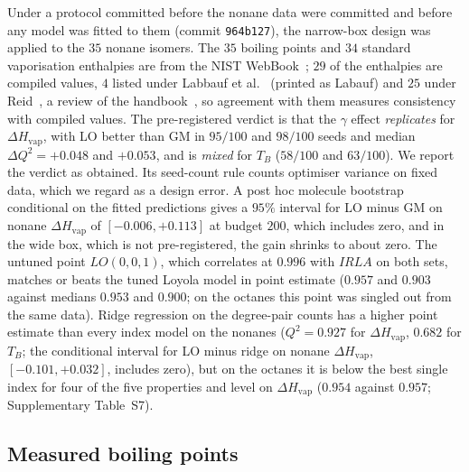 Under a protocol committed before the nonane data were committed and
before any model was fitted to them (commit \texttt{964b127}), the
narrow-box design was applied to the $35$ nonane isomers. The $35$ boiling
points and $34$ standard vaporisation enthalpies are from the NIST
WebBook~\cite{NISTWebBook}; $29$ of the enthalpies are compiled values,
$4$ listed under Labbauf et al.~\cite{LabaufGreenshieldsRossini1961} (printed as Labauf) and
$25$ under Reid~\cite{Reid1972}, a review of the
handbook~\cite{WilhoitZwolinski1971}, so agreement with them measures
consistency with compiled values. The pre-registered verdict is that the
$\gamma$ effect \emph{replicates} for $\Delta H_{\mathrm{vap}}$, with LO
better than GM in $95/100$ and $98/100$ seeds and median
$\Delta Q^2 = +0.048$ and $+0.053$, and is \emph{mixed} for $T_B$ ($58/100$
and $63/100$). We report the verdict as obtained. Its seed-count rule
counts optimiser variance on fixed data, which we regard as a design
error. A post hoc molecule bootstrap conditional on the fitted predictions gives a
$95\%$ interval for LO minus GM on nonane $\Delta H_{\mathrm{vap}}$ of
$[-0.006, +0.113]$ at budget $200$, which includes zero, and in the wide
box, which is not pre-registered, the gain shrinks to about zero. The
untuned point $LO(0,0,1)$, which correlates at $0.996$ with $IRLA$ on both
sets, matches or beats the tuned Loyola model in point estimate ($0.957$ and $0.903$ against
medians $0.953$ and $0.900$; on the octanes this point was singled out
from the same data). Ridge regression on the degree-pair counts has a
higher point estimate than every index model on the nonanes
($Q^2 = 0.927$ for $\Delta H_{\mathrm{vap}}$, $0.682$ for $T_B$; the conditional
interval for LO minus ridge on nonane $\Delta H_{\mathrm{vap}}$, $[-0.101, +0.032]$,
includes zero), but on the
octanes it is below the best single index for four of the five properties
and level on $\Delta H_{\mathrm{vap}}$ ($0.954$ against $0.957$; Supplementary
Table~S7).

\subsection{Measured boiling points}\label{sec:bp}

